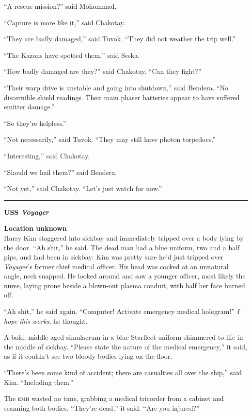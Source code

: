 \documentclass[twoside,letterpaper,12pt]{memoir}
\begin{document}
``A rescue mission?'' said Mohommad.

``Capture is more like it,'' said Chakotay.

``They are badly damaged,'' said Tuvok. ``They did not weather the trip well.''

``The Kazons have spotted them,'' said Seska.

``How badly damaged are they?'' said Chakotay. ``Can they fight?''

``Their warp drive is unstable and going into shutdown,'' said Bendera. ``No discernible shield readings. Their main phaser batteries appear to have suffered emitter damage.''

``So they're helpless.''

``Not necessarily,'' said Tuvok. ``They may still have photon torpedoes.''

``Interesting,'' said Chakotay.

``Should we hail them?'' said Bendera.

``Not yet,'' said Chakotay. ``Let's just watch for now.''

\fancybreak{\rule{3cm}{0.4 pt}}
\noindent\textbf{USS \textit{Voyager}}

\noindent\textbf{Location unknown}\\

Harry Kim staggered into sickbay and immediately tripped over a body lying by the door. ``Ah shit,'' he said. The dead man had a blue uniform, two and a half pips, and had been in sickbay: Kim was pretty sure he'd just tripped over \textit{Voyager}'s former chief medical officer. His head was cocked at an unnatural angle, neck snapped. He looked around and saw a younger officer, most likely the nurse, laying prone beside a blown-out plasma conduit, with half her face burned off.

``Ah shit,'' he said again. ``Computer! Activate emergency medical hologram!'' \textit{I hope this works}, he thought.

A bald, middle-aged simulacrum in a blue Starfleet uniform shimmered to life in the middle of sickbay. ``Please state the nature of the medical emergency,'' it said, as if it couldn't see two bloody bodies lying on the floor.

``There's been some kind of accident; there are casualties all over the ship,'' said Kim. ``Including them.''

The \textsc{emh} wasted no time, grabbing a medical tricorder from a cabinet and scanning both bodies. ``They're dead,'' it said. ``Are you injured?''
\end{document}
